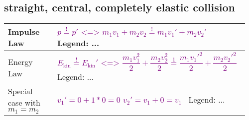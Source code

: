 \documentclass[main.tex,fontsize=8pt,paper=a4,paper=portrait,DIV=calc,]{scrartcl}
\begin{document}
\begin{table}[ht!]
\subsection{straight, central, completely elastic collision}
\begin{tabular}{|m{0.2\linewidth}|m{0.755\linewidth}|}
\hline
Impulse Law & 
\vspace{2mm}
\Huge \textcolor{purple}{\( p \overset{!}{=} p' \text{ <=> } m_1v_1 + m_2v_2 \overset{!}{=} m_1v_1' + m_2v_2' \)}\newline
\normalsize \, \newline
Legend:\newline
...
\\
\hline
Energy Law & 
\vspace{2mm}
\Huge \textcolor{purple}{\( E_{\text{kin}} \overset{!}{=} E_{\text{kin}}' \text{ <=> } \dfrac{m_1v_1^2}{2} + \dfrac{m_2v_2^2}{2} \overset{1}{=} \dfrac{m_1v_1'^2}{2} + \dfrac{m_2v_2'^2}{2} \)}\newline
\normalsize \, \newline
Legend:\newline
...
\\
\hline
Special case with \(m_1 = m_2\) & 
\vspace{2mm}
\Huge \textcolor{purple}{\( v_1' = 0 + 1 * 0 = 0 \)}\newline
\textcolor{purple}{\( v_2' = v_1 + 0 = v_1\)}\newline
\normalsize \, \newline
Legend: \newline
...
\\
\hline
\end{tabular}

\end{table}
\end{document}
